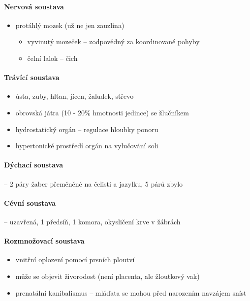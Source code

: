 \paragraph{Nervová soustava}
\begin{itemize}
\item protáhlý mozek (už ne jen zauzlina)
	\begin{itemize}
	\item vyvinutý mozeček -- zodpovědný za koordinované pohyby
	\item čelní lalok -- čich
	\end{itemize}
\end{itemize}

\paragraph{Trávící soustava}
\begin{itemize}
\item ústa, zuby, hltan, jícen, žaludek, střevo
\item obrovská játra (10 - 20\% hmotnosti jedince) se žlučníkem 
\item hydrostatický orgán -- regulace hloubky ponoru
\item hypertonické prostředí \ra orgán na vylučování soli
\end{itemize}

\paragraph{Dýchací soustava} -- 2 páry žaber přeměněné na čelisti a jazylku, 5 párů zbylo

\paragraph{Cévní soustava} -- uzavřená, 1 předsíň, 1 komora, okysličení krve v žábrách

\paragraph{Rozmnožovací soustava}
\begin{itemize}
\item vnitřní oplození pomocí prsních ploutví
\item může se objevit živorodost (není placenta, ale žloutkový vak)
\item prenatální kanibalismus -- mláďata se mohou před narozením navzájem sníst
\end{itemize}


